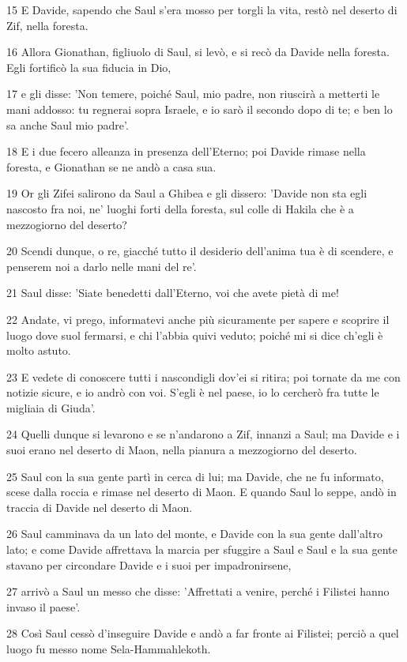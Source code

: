 \par 15 E Davide, sapendo che Saul s'era mosso per torgli la vita, restò nel deserto di Zif, nella foresta.
\par 16 Allora Gionathan, figliuolo di Saul, si levò, e si recò da Davide nella foresta. Egli fortificò la sua fiducia in Dio,
\par 17 e gli disse: 'Non temere, poiché Saul, mio padre, non riuscirà a metterti le mani addosso: tu regnerai sopra Israele, e io sarò il secondo dopo di te; e ben lo sa anche Saul mio padre'.
\par 18 E i due fecero alleanza in presenza dell'Eterno; poi Davide rimase nella foresta, e Gionathan se ne andò a casa sua.
\par 19 Or gli Zifei salirono da Saul a Ghibea e gli dissero: 'Davide non sta egli nascosto fra noi, ne' luoghi forti della foresta, sul colle di Hakila che è a mezzogiorno del deserto?
\par 20 Scendi dunque, o re, giacché tutto il desiderio dell'anima tua è di scendere, e penserem noi a darlo nelle mani del re'.
\par 21 Saul disse: 'Siate benedetti dall'Eterno, voi che avete pietà di me!
\par 22 Andate, vi prego, informatevi anche più sicuramente per sapere e scoprire il luogo dove suol fermarsi, e chi l'abbia quivi veduto; poiché mi si dice ch'egli è molto astuto.
\par 23 E vedete di conoscere tutti i nascondigli dov'ei si ritira; poi tornate da me con notizie sicure, e io andrò con voi. S'egli è nel paese, io lo cercherò fra tutte le migliaia di Giuda'.
\par 24 Quelli dunque si levarono e se n'andarono a Zif, innanzi a Saul; ma Davide e i suoi erano nel deserto di Maon, nella pianura a mezzogiorno del deserto.
\par 25 Saul con la sua gente partì in cerca di lui; ma Davide, che ne fu informato, scese dalla roccia e rimase nel deserto di Maon. E quando Saul lo seppe, andò in traccia di Davide nel deserto di Maon.
\par 26 Saul camminava da un lato del monte, e Davide con la sua gente dall'altro lato; e come Davide affrettava la marcia per sfuggire a Saul e Saul e la sua gente stavano per circondare Davide e i suoi per impadronirsene,
\par 27 arrivò a Saul un messo che disse: 'Affrettati a venire, perché i Filistei hanno invaso il paese'.
\par 28 Così Saul cessò d'inseguire Davide e andò a far fronte ai Filistei; perciò a quel luogo fu messo nome Sela-Hammahlekoth.

